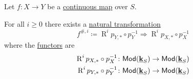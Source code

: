 \documentclass[../../main]{subfiles}
\begin{document}
\begin{lemma}\label{lemma:induced-map-over}
  Let \(f\colon X \to Y\) be a \hyperref[def:continuous-map-over]{continuous map} over \(S\).

  For all \(i \geq 0\) there exists a \hyperref[def:natural-transformation]{natural transformation}
  \begin{equation*}
    f^{\#, i} \coloneq \operatorname{R}^{i}p_{Y, \ast} \circ p_{Y}^{-1} \Rightarrow \operatorname{R}^{i}p_{X, \ast} \circ p_{X}^{-1}
  \end{equation*}
  where the \hyperref[def:functor]{functors} are
  \begin{align*}
    \operatorname{R}^{i}p_{X, \ast} \circ p_{X}^{-1}\colon& \mathsf{Mod}(\underline{\mathbf{k}}_{S}) \to \mathsf{Mod}(\underline{\mathbf{k}}_{S}) \\
    \operatorname{R}^{i}p_{Y, \ast} \circ p_{Y}^{-1}\colon& \mathsf{Mod}(\underline{\mathbf{k}}_{S}) \to \mathsf{Mod}(\underline{\mathbf{k}}_{S})
  \end{align*}
\end{lemma}
\end{document}
